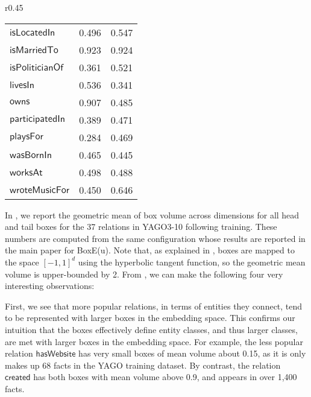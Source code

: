 \documentclass{article}
\begin{document}
\begin{wraptable}[43]{r}{0.45\textwidth}
\begin{tabular}{l@{\hskip 6pt}c@{\hskip 3pt}c@{\hskip 3pt}}
		$\mathsf{isLocatedIn}$ & 0.496 & 0.547  \\
		$\mathsf{isMarriedTo}$ & 0.923 & 0.924\\
		$\mathsf{isPoliticianOf}$ & 0.361 & 0.521\\
		$\mathsf{livesIn}$ & 0.536 & 0.341 \\
		$\mathsf{owns}$ & 0.907 & 0.485\\
		$\mathsf{participatedIn}$ & 0.389 & 0.471 \\
		$\mathsf{playsFor}$ & 0.284 & 0.469\\
		$\mathsf{wasBornIn}$ & 0.465 & 0.445\\
		$\mathsf{worksAt}$ & 0.498 & 0.488\\
		$\mathsf{wroteMusicFor}$ & 0.450 & 0.646\\
		\bottomrule
	\end{tabular}
\end{wraptable}

In , we report the geometric mean of box volume across dimensions for all head and tail boxes for the 37 relations in YAGO3-10 following training. 
These numbers are computed from the same configuration whose results are reported in the main paper for BoxE(u). Note that, as explained in , boxes are mapped to the space $[-1,1]^d$ using the hyperbolic tangent function, so the geometric mean volume is upper-bounded by 2. From , we can make the following four very interesting observations: 

First, we see that more popular relations, in terms of entities they connect, tend to be represented with larger boxes in the embedding space. This confirms our intuition that the boxes effectively define entity classes, and thus larger classes, are met with larger boxes in the embedding space. 
For example, the less popular relation $\mathsf{hasWebsite}$ has very small boxes of mean volume about 0.15, as it is only makes up 68 facts in the YAGO training dataset. By contrast, the relation $\mathsf{created}$ has both boxes with mean volume above 0.9, and appears in over 1,400 facts. 
\end{document}
